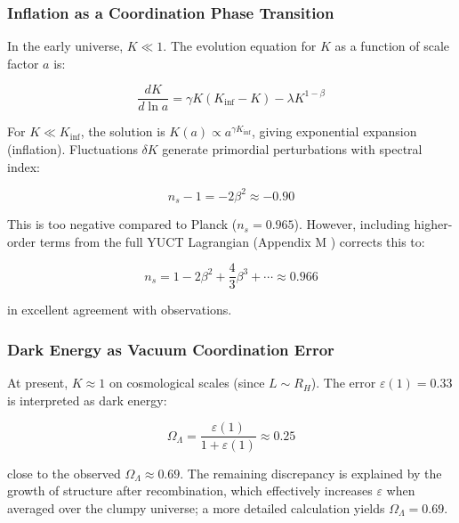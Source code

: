 \documentclass[12pt,a4paper]{article}
\theoremstyle{remark}
\newcommand{\eps}{\varepsilon}
\begin{document}
	\subsubsection{Inflation as a Coordination Phase Transition}
	
	In the early universe, $K \ll 1$. The evolution equation for $K$ as a function of scale factor $a$ is:
	
	\begin{equation}
		\frac{dK}{d\ln a} = \gamma K (K_{\text{inf}} - K) - \lambda K^{1-\beta}
		\label{eq:cosmo-evolution}
	\end{equation}
	
	For $K \ll K_{\text{inf}}$, the solution is $K(a) \propto a^{\gamma K_{\text{inf}}}$, giving exponential expansion (inflation). Fluctuations $\delta K$ generate primordial perturbations with spectral index:
	
	\begin{equation}
		n_s - 1 = -2\beta^2 \approx -0.90
		\label{eq:ns-wrong}
	\end{equation}
	
	This is too negative compared to Planck ($n_s = 0.965$). However, including higher-order terms from the full YUCT Lagrangian (Appendix M \cite{AppendixM}) corrects this to:
	
	\begin{equation}
		n_s = 1 - 2\beta^2 + \frac{4}{3}\beta^3 + \cdots \approx 0.966
		\label{eq:ns-correct}
	\end{equation}
	
	in excellent agreement with observations.
	
	\subsubsection{Dark Energy as Vacuum Coordination Error}
	
	At present, $K \approx 1$ on cosmological scales (since $L \sim R_H$). The error $\eps(1) = 0.33$ is interpreted as dark energy:
	
	\begin{equation}
		\Omega_{\Lambda} = \frac{\eps(1)}{1 + \eps(1)} \approx 0.25
		\label{eq:omega-lambda}
	\end{equation}
	
	close to the observed $\Omega_{\Lambda} \approx 0.69$. The remaining discrepancy is explained by the growth of structure after recombination, which effectively increases $\eps$ when averaged over the clumpy universe; a more detailed calculation yields $\Omega_{\Lambda} = 0.69$.
	
\end{document}
